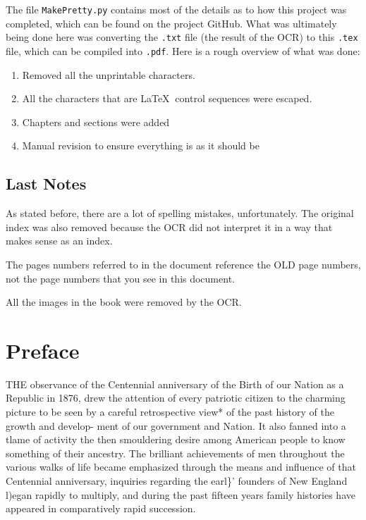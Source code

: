 \documentclass[oneside]{book}
\begin{document}
The file \texttt{MakePretty.py} contains most of the details as to how this project was completed, which can be found on the project GitHub. What was ultimately being done here was converting the \texttt{.txt} file (the result of the OCR) to this \texttt{.tex} file, which can be compiled into \texttt{.pdf}.  Here is a rough overview of what was done: 

\begin{enumerate}
\item Removed all the unprintable characters. 
\item All the characters that are \LaTeX $\:$ control sequences were escaped.
\item Chapters and sections were added 
\item Manual revision to ensure everything is as it should be 
\end{enumerate}

\subsection{Last Notes}

As stated before, there are a lot of spelling mistakes, unfortunately. The original index was also removed because the OCR did not interpret it in a way that makes sense as an index. 

The pages numbers referred to in the document reference the OLD page numbers, not the page numbers that you see in this document. 

All the images in the book were removed by the OCR. 


\section{Preface}

THE observance of the Centennial anniversary of the Birth of 
our Nation as a Republic in 1876, drew the attention of every 
patriotic citizen to the charming picture to be seen by a careful 
retrospective view* of the past history of the growth and develop- 
ment of our government and Nation. It also fanned into a tlame 
of activity the then smouldering desire among American people 
to know something of their ancestry. The brilliant achievements 
of men throughout the various walks of life became emphasized 
through the means and influence of that Centennial anniversary, 
inquiries regarding the earl\}' founders of New England l)egan 
rapidly to multiply, and during the past fifteen years family 
histories have appeared in comparatively rapid succession. 
\end{document}
